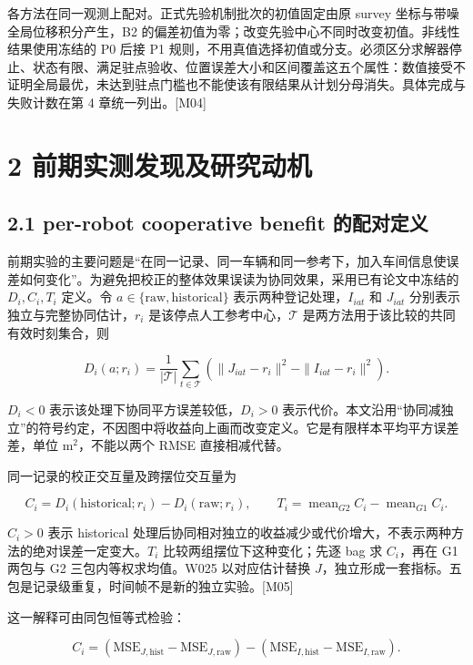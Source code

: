 \documentclass[12pt,a4paper]{article}
\begin{document}
各方法在同一观测上配对。正式先验机制批次的初值固定由原 survey
坐标与带噪全局位移积分产生，B2
的偏差初值为零；改变先验中心不同时改变初值。非线性结果使用冻结的 P0 后接
P1
规则，不用真值选择初值或分支。必须区分求解器停止、状态有限、满足驻点验收、位置误差大小和区间覆盖这五个属性：数值接受不证明全局最优，未达到驻点门槛也不能使该有限结果从计划分母消失。具体完成与失败计数在第
4 章统一列出。{[}M04{]}

\section{2
前期实测发现及研究动机}\label{ux524dux671fux5b9eux6d4bux53d1ux73b0ux53caux7814ux7a76ux52a8ux673a}

\subsection{2.1 per-robot cooperative benefit
的配对定义}\label{per-robot-cooperative-benefit-ux7684ux914dux5bf9ux5b9aux4e49}

前期实验的主要问题是``在同一记录、同一车辆和同一参考下，加入车间信息使误差如何变化''。为避免把校正的整体效果误读为协同效果，采用已有论文中冻结的
\(D_i,C_i,T_i\) 定义。令 \(a\in\{\mathrm{raw},\mathrm{historical}\}\)
表示两种登记处理，\(I_{iat}\) 和 \(J_{iat}\)
分别表示独立与完整协同估计，\(r_i\) 是该停点人工参考中心，\(\mathcal T\)
是两方法用于该比较的共同有效时刻集合，则

\[D_i(a;r_i)=\frac1{|\mathcal T|}\sum_{t\in\mathcal T}
\left(\|J_{iat}-r_i\|^2-\|I_{iat}-r_i\|^2\right).\]

\(D_i<0\) 表示该处理下协同平方误差较低，\(D_i>0\)
表示代价。本文沿用``协同减独立''的符号约定，不因图中将收益向上画而改变定义。它是有限样本平均平方误差差，单位
\(\mathrm m^2\)，不能以两个 RMSE 直接相减代替。

同一记录的校正交互量及跨摆位交互量为

\[C_i=D_i(\mathrm{historical};r_i)-D_i(\mathrm{raw};r_i),\qquad
T_i=\operatorname{mean}_{G2}C_i-\operatorname{mean}_{G1}C_i.\]

\(C_i>0\) 表示 historical
处理后协同相对独立的收益减少或代价增大，不表示两种方法的绝对误差一定变大。\(T_i\)
比较两组摆位下这种变化；先逐 bag 求 \(C_i\)，再在 G1 两包与 G2
三包内等权求均值。W025 以对应估计替换
\(J\)，独立形成一套指标。五包是记录级重复，时间帧不是新的独立实验。{[}M05{]}

这一解释可由同包恒等式检验：

\[C_i=(\mathrm{MSE}_{J,\mathrm{hist}}-\mathrm{MSE}_{J,\mathrm{raw}})
 -(\mathrm{MSE}_{I,\mathrm{hist}}-\mathrm{MSE}_{I,\mathrm{raw}}).\]
\end{document}
